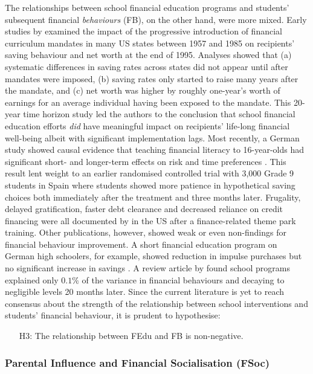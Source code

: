 The relationships between school financial education programs and students' subsequent financial \emph{behaviours} (FB), on the other hand, were more mixed. Early studies by \citet{bernheim:2001} examined the impact of the progressive introduction of financial curriculum mandates in many US states between 1957 and 1985 on recipients' saving behaviour and net worth at the end of 1995. Analyses showed that (a) systematic differences in saving rates across states did not appear until after mandates were imposed, (b) saving rates only started to raise many years after the mandate, and (c) net worth was higher by roughly one-year's worth of earnings for an average individual having been exposed to the mandate. This 20-year time horizon study led the authors to the conclusion that school financial education efforts \emph{did} have meaningful impact on recipients' life-long financial well-being albeit with significant implementation lags. Most recently, a German study showed causal evidence that teaching financial literacy to 16-year-olds had significant short- and longer-term effects on risk and time preferences \citep{sutter:2020}. This result lent weight to an earlier randomised controlled trial with 3,000 Grade 9 students in Spain \citep{bover:2018} where students showed more patience in hypothetical saving choices both immediately after the treatment and three months later. Frugality, delayed gratification, faster debt clearance and decreased reliance on credit financing were all documented by \citet{carlin:2012b} in the US after a finance-related theme park training. Other publications, however, showed weak or even non-findings for financial behaviour improvement. A short financial education program on German high schoolers, for example, showed reduction in impulse purchases but no significant increase in savings \citep{luhrmann:2015}. A review article by \citet{fernandes:2014} found school programs explained only $0.1\%$ of the variance in financial behaviours and decaying to negligible levels 20 months later. Since the current literature is yet to reach consensus about the strength of the relationship between school interventions and students' financial behaviour, it is prudent to hypothesise:
\begin{itemize}
    \item[H3:] The relationship between FEdu and FB is non-negative.
\end{itemize}

\subsubsection{Parental Influence and Financial Socialisation (FSoc)}

